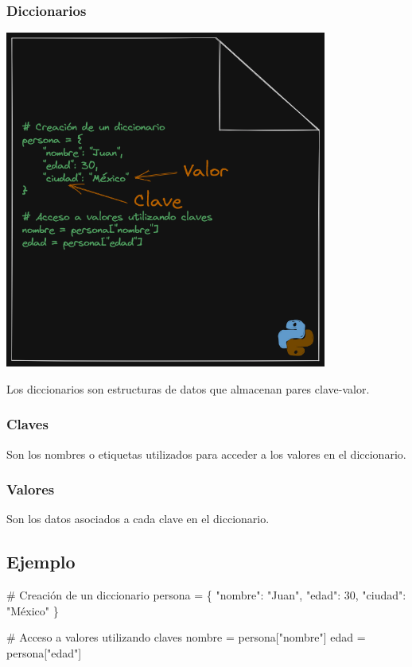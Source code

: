\documentclass[
  a4paper,
  DIV=11,
  numbers=noendperiod,
  onepage,
  openany]{scrreprt}
\newenvironment{Shaded}{\begin{snugshade}}{\end{snugshade}}
\newcommand{\CommentTok}[1]{\textcolor[rgb]{0.37,0.37,0.37}{#1}}
\newcommand{\DecValTok}[1]{\textcolor[rgb]{0.68,0.00,0.00}{#1}}
\newcommand{\NormalTok}[1]{\textcolor[rgb]{0.00,0.23,0.31}{#1}}
\newcommand{\OperatorTok}[1]{\textcolor[rgb]{0.37,0.37,0.37}{#1}}
\newcommand{\StringTok}[1]{\textcolor[rgb]{0.13,0.47,0.30}{#1}}
\begin{document}
\subsubsection{Diccionarios}\label{diccionarios-1}

\includegraphics[width=4.16667in,height=\textheight]{unidades/unidad3/images/diccionary001.png}

Los diccionarios son estructuras de datos que almacenan pares
clave-valor.

\subsubsection{Claves}\label{claves}

Son los nombres o etiquetas utilizados para acceder a los valores en el
diccionario.

\subsubsection{Valores}\label{valores}

Son los datos asociados a cada clave en el diccionario.

\subsection{Ejemplo}\label{ejemplo-5}

\begin{Shaded}
\begin{Highlighting}[]
\CommentTok{\# Creación de un diccionario}
\NormalTok{persona }\OperatorTok{=}\NormalTok{ \{}
    \StringTok{"nombre"}\NormalTok{: }\StringTok{"Juan"}\NormalTok{,}
    \StringTok{"edad"}\NormalTok{: }\DecValTok{30}\NormalTok{,}
    \StringTok{"ciudad"}\NormalTok{: }\StringTok{"México"}
\NormalTok{\}}

\CommentTok{\# Acceso a valores utilizando claves}
\NormalTok{nombre }\OperatorTok{=}\NormalTok{ persona[}\StringTok{"nombre"}\NormalTok{]}
\NormalTok{edad }\OperatorTok{=}\NormalTok{ persona[}\StringTok{"edad"}\NormalTok{]}
\end{Highlighting}
\end{Shaded}
\end{document}
